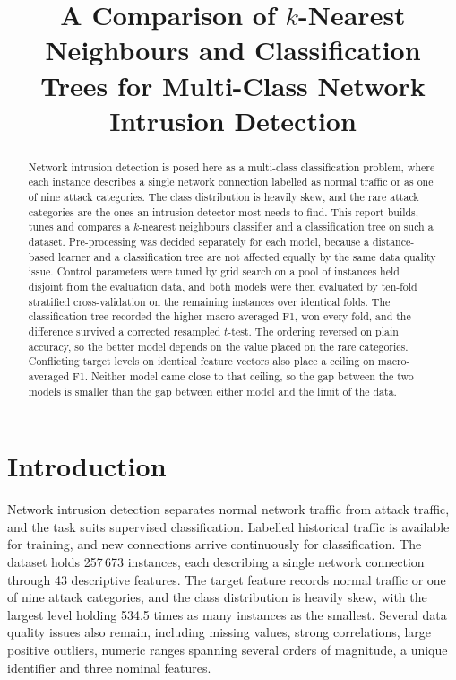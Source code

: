 \documentclass[conference]{IEEEtran}
\begin{document}
\title{A Comparison of $k$-Nearest Neighbours and Classification Trees for
Multi-Class Network Intrusion Detection}

\author{
}

\maketitle

\begin{abstract}
Network intrusion detection is posed here as a multi-class classification
problem, where each instance describes a single network connection labelled
as normal traffic or as one of nine attack categories. The class distribution
is heavily skew, and the rare attack categories are the ones an intrusion
detector most needs to find. This report builds, tunes and compares a
$k$-nearest neighbours classifier and a classification tree on such a
dataset. Pre-processing was decided separately for each model, because a
distance-based learner and a classification tree are not affected equally by
the same data quality issue. Control parameters were tuned by grid search on
a pool of instances held disjoint from the evaluation data, and both models
were then evaluated by ten-fold stratified cross-validation on the remaining
instances over identical folds. The classification tree recorded the higher
macro-averaged F1, won every fold, and the difference survived a corrected
resampled $t$-test. The ordering reversed on plain accuracy, so the better
model depends on the value placed on the rare categories. Conflicting target
levels on identical feature vectors also place a ceiling on macro-averaged
F1. Neither model came close to that ceiling, so the gap between the two
models is smaller than the gap between either model and the limit of the
data.
\end{abstract}

\section{Introduction}

Network intrusion detection separates normal network traffic from attack
traffic, and the task suits supervised classification. Labelled historical
traffic is available for training, and new connections arrive continuously for
classification. The dataset holds 257\,673 instances, each describing a single
network connection through 43 descriptive features. The target feature records
normal traffic or one of nine attack categories, and the class distribution is
heavily skew, with the largest level holding 534.5 times as many instances as
the smallest. Several data quality issues also remain, including missing
values, strong correlations, large positive outliers, numeric ranges spanning
several orders of magnitude, a unique identifier and three nominal features.
\end{document}
